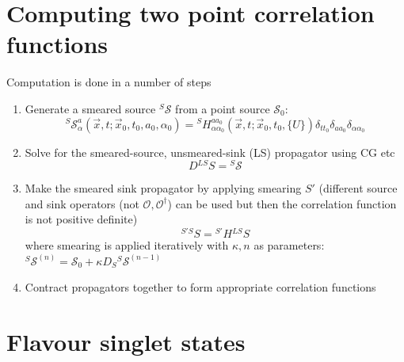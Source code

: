 \section{Computing two point correlation functions}
Computation is done in a number of steps
\begin{enumerate}
    \item Generate a smeared source ${}^S \mathcal{S}$ from a point source $\mathcal{S}_0$:
    \begin{equation}
        {}^S \mathcal{S}_\alpha^a(\vec{x}, t ; \vec{x}_0, t_0, a_0, \alpha_0) = {}^S H_{\alpha \alpha_0}^{a a_0}(\vec{x}, t;\vec{x}_0, t_0, \{U\}) \delta_{t t_0} \delta_{a a_0} \delta_{\alpha \alpha_0}
    \end{equation}
    \item Solve for the smeared-source, unsmeared-sink  (LS) propagator using CG etc
    \begin{equation}
        D {}^{LS}S = {}^S \mathcal{S}
    \end{equation}
    \item Make the smeared sink propagator by applying smearing $S'$ (different source and sink operators (not $\mathcal{O}, \mathcal{O}^\dagger$) can be used but then the correlation function is not positive definite)
    \begin{equation}
        {}^{S' S}S = {}^{S'}H{}^{LS}S 
    \end{equation}
    where smearing is applied iteratively with $\kappa, n$ as parameters: ${}^S \mathcal{S}^{(n)} = \mathcal{S}_0 + \kappa D_S {}^S \mathcal{S}^{(n-1)}$
    
    \item Contract propagators together to form appropriate correlation functions
\end{enumerate}

\section{Flavour singlet states}

